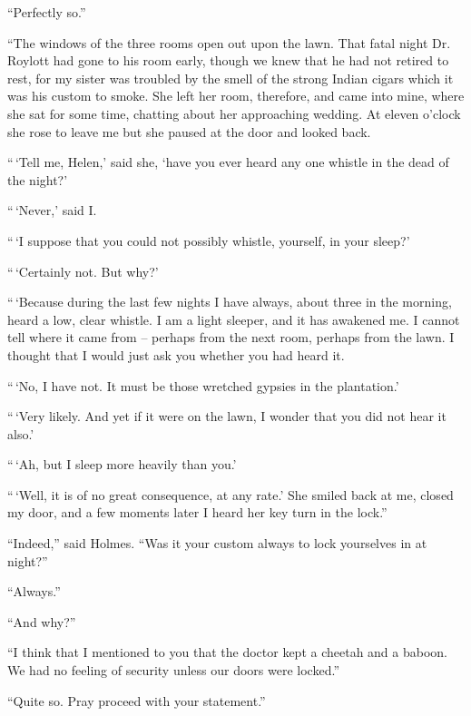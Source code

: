 “Perfectly so.”

“The windows of the three rooms open out upon the lawn.
That fatal night Dr. Roylott had gone to his room early,
though we knew that he had not retired to rest, for my sister
was troubled by the smell of the strong Indian cigars which
it was his custom to smoke. She left her room, therefore,
and came into mine, where she sat for some time, chatting
about her approaching wedding. At eleven o’clock she rose
to leave me but she paused at the door and looked back.

“\,‘Tell me, Helen,’ said she, ‘have you ever heard any one
whistle in the dead of the night?’

“\,‘Never,’ said I.

“\,‘I suppose that you could not possibly whistle, yourself,
in your sleep?’

“\,‘Certainly not. But why?’

“\,‘Because during the last few nights I have always, about
three in the morning, heard a low, clear whistle. I am a light
sleeper, and it has awakened me. I cannot tell where it came
from -- perhaps from the next room, perhaps from the lawn. I
thought that I would just ask you whether you had heard it.

“\,‘No, I have not. It must be those wretched gypsies in
the plantation.’

“\,‘Very likely. And yet if it were on the lawn, I wonder
that you did not hear it also.’

“\,‘Ah, but I sleep more heavily than you.’

“\,‘Well, it is of no great consequence, at any rate.’ She
smiled back at me, closed my door, and a few moments later
I heard her key turn in the lock.”

“Indeed,” said Holmes. “Was it your custom always to
lock yourselves in at night?”

“Always.”

“And why?”

“I think that I mentioned to you that the doctor kept a
cheetah and a baboon. We had no feeling of security unless
our doors were locked.”

“Quite so. Pray proceed with your statement.”

